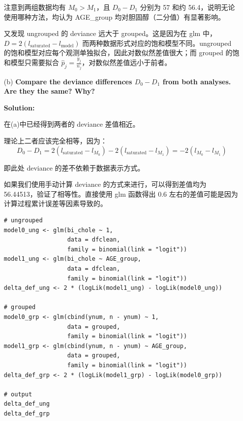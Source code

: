 \begin{enumerate}
注意到两组数据均有 $M_0 > M_1$，且 $D_0 - D_1$ 分别为 57 和约 56.4，说明无论使用哪种方法，均认为 AGE\_group 均对胆固醇（二分值）有显著影响。

又发现 ungrouped 的 deviance 远大于 grouped。这是因为在 glm 中，$D = 2(l_{\text{saturated}} - l_{\text{model}})$ 而两种数据形式对应的饱和模型不同。ungrouped 的饱和模型对应每个观测单独拟合，因此对数似然差值很大；而 grouped 的饱和模型只需要拟合 $\hat{p}_j = \frac{y_j}{n_j}$，对数似然差值远小于前者。

\bigskip

\item[(b)] \textbf{Compare the deviance differences $D_0 - D_1$ from both analyses. Are they the same? Why?}

\textbf{Solution:}

在(a)中已经得到两者的 deviance 差值相近。

理论上二者应该完全相等，因为：
\[
D_0 - D_1 = 2(l_{\text{saturated}} - l_{M_0}) - 2(l_{\text{saturated}} - l_{M_1}) = -2(l_{M_0} - l_{M_1})
\]

即此处 deviance 的差不依赖于数据表示方式。

如果我们使用手动计算 deviance 的方式来进行，可以得到差值均为 56.44513，验证了相等性。直接使用 glm 函数得出 0.6 左右的差值可能是因为计算过程累计误差等因素导致的。

\begin{lstlisting}[caption={Manual Deviance Calculation}]
# ungrouped
model0_ung <- glm(bi_chole ~ 1,
                  data = dfclean,
                  family = binomial(link = "logit"))
model1_ung <- glm(bi_chole ~ AGE_group,
                  data = dfclean,
                  family = binomial(link = "logit"))
delta_def_ung <- 2 * (logLik(model1_ung) - logLik(model0_ung))

# grouped
model0_grp <- glm(cbind(ynum, n - ynum) ~ 1,
                  data = grouped,
                  family = binomial(link = "logit"))
model1_grp <- glm(cbind(ynum, n - ynum) ~ AGE_group,
                  data = grouped,
                  family = binomial(link = "logit"))
delta_def_grp <- 2 * (logLik(model1_grp) - logLik(model0_grp))

# output
delta_def_ung
delta_def_grp
\end{lstlisting}
\end{enumerate}
